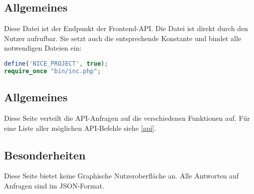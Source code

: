 \subsection{Allgemeines} Diese Datei ist der Endpunkt der Frontend-API.
Die Datei ist direkt durch den Nutzer aufrufbar. Sie setzt auch die entsprechende Konstante und bindet alle notwendigen Dateien ein:
\begin{lstlisting}[language=php]
define('NICE_PROJECT', true);
require_once "bin/inc.php";
\end{lstlisting}
\subsection{Allgemeines}
Diese Seite verteilt die API-Anfragen auf die verschiedenen Funktionen auf. Für eine Liste aller möglichen API-Befehle siehe \autoref{api}.
\subsection{Besonderheiten}
Diese Seite bietet keine Graphische Nutzeroberfläche an. Alle Antworten auf Anfragen sind im JSON-Format.